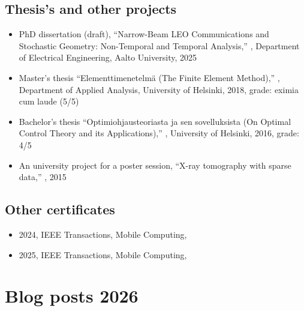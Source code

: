 \documentclass{article}
\begin{document}
        \subsection{Thesis's and other projects}
        \begin{itemize}
        \item PhD dissertation (draft), ``Narrow-Beam LEO Communications and Stochastic Geometry: Non-Temporal and Temporal Analysis,'' , Department of Electrical Engineering, Aalto University, 2025          
        \item Master's thesis ``Elementtimenetelmä (The Finite Element Method),'' , Department of Applied Analysis, University of Helsinki, 2018, grade: eximia cum laude (5/5)
        \item Bachelor's thesis ``Optimiohjausteoriasta ja sen sovelluksista (On Optimal Control Theory and its Applications),'' , University of Helsinki, 2016, grade: 4/5         
        \item An university project for a poster session, ``X-ray tomography with sparse data,'' , 2015
          
        \end{itemize}
        
        \subsection{Other certificates}
        \begin{itemize}
        \item 2024, IEEE Transactions, Mobile Computing, 
        \item 2025, IEEE Transactions, Mobile Computing, 
        \end{itemize}        

        \section{Blog posts 2026}
                         
\end{document}
